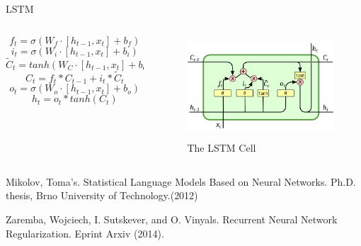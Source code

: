 \documentclass[aspectratio=169]{beamer}
\begin{document}
    \begin{frame}{LSTM}
      \begin{columns}
      \begin{column}[t]{0.5\textwidth}
        \begin{equation}
           f_t = \sigma(W_f \cdot [h_{t-1}, x_t] + b_f)
        \end{equation}
        \begin{equation}
           i_t = \sigma(W_i \cdot [h_{t-1}, x_t] + b_i)
        \end{equation}
        \begin{equation}
           \tilde{C}_t = tanh(W_C \cdot [h_{t-1}, x_t] + b_C) 
        \end{equation}
        \begin{equation}
           C_t = f_t * C_{t-1} + i_t * \tilde{C}_t
        \end{equation}
        \begin{equation}
           o_t = \sigma(W_o \cdot [h_{t-1}, x_t] + b_o)
        \end{equation}
        \begin{equation}
           h_t = o_t * tanh(C_t)
        \end{equation}
      \end{column}

      \begin{column}[t]{0.5\textwidth}
        \begin{figure}
        \includegraphics[height=1.5in, width=2.44in]{lstm2.png}
        \caption{The LSTM Cell}
        \end{figure}
      \end{column}

      \end{columns}
      \vspace*{2em}

      \tiny
      Mikolov, Toma's. Statistical Language Models Based on Neural Networks. Ph.D. thesis, Brno University of Technology.(2012)

      Zaremba, Wojciech, I. Sutskever, and O. Vinyals. Recurrent Neural Network Regularization. Eprint Arxiv (2014).
    \end{frame}
\end{document}
